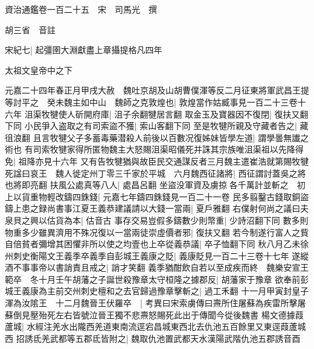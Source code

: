 






























































資治通鑑卷一百二十五　宋　司馬光　撰

胡三省　音註

宋紀七|{
	起彊圉大淵獻盡上章攝提格凡四年}


太祖文皇帝中之下

元嘉二十四年春正月甲戌大赦　魏吐京胡及山胡曹僕渾等反二月征東將軍武昌王提等討平之　癸未魏主如中山　魏師之克敦煌也|{
	敦煌當作姑臧事見一百二十三卷十六年}
沮渠牧犍使人斫開府庫|{
	沮子余翻犍居言翻}
取金玉及寶器因不復閉|{
	復扶又翻下同}
小民爭入盗取之有司索盜不獲|{
	索山客翻下同}
至是牧犍所親及守藏者告之|{
	藏徂浪翻}
且言牧犍父子多蓄毒藥潜殺人前後以百數况復姊妹皆學左道|{
	謂學曇無䜟之術也}
有司索牧犍家得所匿物魏主大怒賜沮渠昭儀死并誅其宗族唯沮渠祖以先降得免|{
	祖降亦見十六年}
又有告牧犍猶與故臣民交通謀反者三月魏主遣崔浩就第賜牧犍死諡曰哀王　魏人徙定州丁零三千家於平城　六月魏西征諸將|{
	西征謂討蓋吳之將也將即亮翻}
扶風公處真等八人|{
	處昌呂翻}
坐盜没軍資及虜掠各千萬計並斬之　初上以貨重物輕改鑄四銖錢|{
	元嘉七年鑄四銖錢見一百二十一卷}
民多翦鑿古錢取銅盜鑄上患之録尚書事江夏王義恭建議請以大錢一當兩|{
	夏戶雅翻}
右僕射何尚之議曰夫泉貝之興以估貨為本|{
	估音古}
事存交易豈假多鑄數少則幣重|{
	少詩沼翻下同}
數多則物重多少雖異濟用不殊况復以一當兩徒崇虛價者邪|{
	復扶又翻}
若今制遂行富人之貲自倍貧者彌增其困懼非所以使之均壹也上卒從義恭議|{
	卒子恤翻下同}
秋八月乙未徐州刺史衡陽文王義季卒義季自彭城王義康之貶|{
	義康貶見一百二十三卷十七年}
遂縱酒不事事帝以書誚責且戒之|{
	誚才笑翻}
義季猶酣飲自若以至成疾而終　魏樂安宣王範卒　冬十月壬午胡藩之子誕世殺豫章太守桓隆之據郡反|{
	胡藩家于豫章}
欲奉前彭城王義康為主前交州刺史檀和之去官歸過豫章擊斬之|{
	過工禾翻}
十一月甲寅封皇子渾為汝隂王　十二月魏晉王伏羅卒　|{
	考異曰宋索虜傳曰燾所住屠蘇為疾雷所擊屠蘇倒見壓殆死左右皆號泣晉王獨不悲燾怒賜死此出于傳聞今從後魏書}
楊文德據葭蘆城|{
	水經注羌水出隴西羌道東南流逕宕昌城東西北去仇池五百餘里又東逕葭蘆城西}
招誘氐羌武都等五郡氐皆附之|{
	魏取仇池置武都天水漢陽武階仇池五郡誘音酉}


